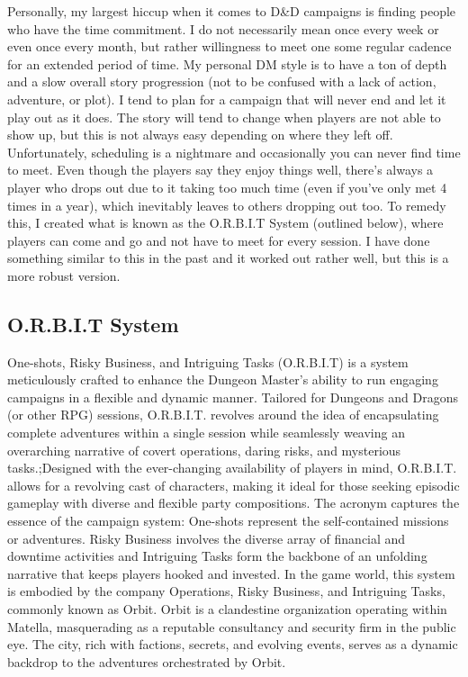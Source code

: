 Personally, my largest hiccup when it comes to D\&D campaigns is finding people who have the time commitment. I do not necessarily mean once every week or even once every month, but rather willingness to meet one some regular cadence for an extended period of time. My personal DM style is to have a ton of depth and a slow overall story progression (not to be confused with a lack of action, adventure, or plot). I tend to plan for a campaign that will never end and let it play out as it does. The story will tend to change when players are not able to show up, but this is not always easy depending on where they left off. Unfortunately, scheduling is a nightmare and occasionally you can never find time to meet. Even though the players say they enjoy things well, there's always a player who drops out due to it taking too much time (even if you've only met 4 times in a year), which inevitably leaves to others dropping out too. To remedy this, I created what is known as the O.R.B.I.T System (outlined below), where players can come and go and not have to meet for every session. I have done something similar to this in the past and it worked out rather well, but this is a more robust version.

\subsection{O.R.B.I.T System}

One-shots, Risky Business, and Intriguing Tasks (O.R.B.I.T) is a system meticulously crafted to enhance the Dungeon Master's ability to run engaging campaigns in a flexible and dynamic manner. Tailored for Dungeons and Dragons (or other RPG) sessions, O.R.B.I.T. revolves around the idea of encapsulating complete adventures within a single session while seamlessly weaving an overarching narrative of covert operations, daring risks, and mysterious tasks.;Designed with the ever-changing availability of players in mind, O.R.B.I.T. allows for a revolving cast of characters, making it ideal for those seeking episodic gameplay with diverse and flexible party compositions. The acronym captures the essence of the campaign system: One-shots represent the self-contained missions or adventures. Risky Business involves the diverse array of financial and downtime activities and Intriguing Tasks form the backbone of an unfolding narrative that keeps players hooked and invested. In the game world, this system is embodied by the company Operations, Risky Business, and Intriguing Tasks, commonly known as Orbit. Orbit is a clandestine organization operating within Matella, masquerading as a reputable consultancy and security firm in the public eye. The city, rich with factions, secrets, and evolving events, serves as a dynamic backdrop to the adventures orchestrated by Orbit.

